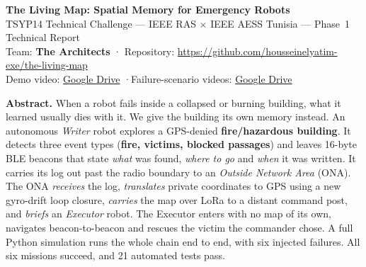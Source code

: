\documentclass[10pt,a4paper]{article}
\begin{document}
\begin{center}
{\LARGE\bfseries\color{ieee} The Living Map: Spatial Memory for Emergency Robots}\\[3pt]
{\large TSYP14 Technical Challenge — IEEE RAS $\times$ IEEE AESS Tunisia — Phase~1 Technical Report}\\[3pt]
{\small Team: \textbf{The Architects} \quad·\quad
Repository: \url{https://github.com/housseinelyatim-exe/the-living-map} \\
Demo video: \href{https://drive.google.com/file/d/13wUDenrrhLHDqce1rXyJ-KN1JE30OrPQ/view?usp=drive\_link}{Google Drive} \quad·\quad Failure-scenario videos: \href{https://drive.google.com/drive/folders/1OTsqPcSpbyh9yzK0YaqPVnGFP-aULrra?usp=drive\_link}{Google Drive}}
\end{center}

\vspace{-4pt}
\noindent\textbf{Abstract.} When a robot fails inside a collapsed or burning building, what it learned usually dies with it.
We give the building its own memory instead. An autonomous \emph{Writer} robot explores a GPS-denied
\textbf{fire/hazardous building}. It detects three event types (\textbf{fire, victims, blocked passages}) and leaves
16-byte BLE beacons that state \emph{what} was found, \emph{where to go} and \emph{when} it was written.
It carries its log out past the radio boundary to an \emph{Outside Network Area} (ONA). The ONA
\emph{receives} the log, \emph{translates} private coordinates to GPS using a new gyro-drift loop closure,
\emph{carries} the map over LoRa to a distant command post, and \emph{briefs} an \emph{Executor} robot.
The Executor enters with no map of its own, navigates beacon-to-beacon and rescues the victim the commander chose.
A full Python simulation runs the whole chain end to end, with six injected failures. All six missions succeed, and
21 automated tests pass.
\end{document}
